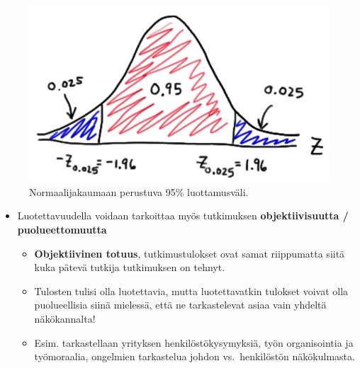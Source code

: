 \documentclass[
]{book}
\providecommand{\tightlist}{%
  \setlength{\itemsep}{0pt}\setlength{\parskip}{0pt}}
\begin{document}
\begin{figure}

{\centering \includegraphics[width=0.75\linewidth]{images/luottamus} 

}

\caption{Normaalijakaumaan perustuva 95\% luottamusväli.}\label{fig:luottamus}
\end{figure}

\begin{itemize}
\tightlist
\item
  Luotettavuudella voidaan tarkoittaa myös tutkimuksen \textbf{objektiivisuutta / puolueettomuutta}

  \begin{itemize}
  \tightlist
  \item
    \textbf{Objektiivinen totuus}, tutkimustulokset ovat samat riippumatta siitä kuka pätevä tutkija tutkimuksen on tehnyt.
  \item
    Tulosten tulisi olla luotettavia, mutta luotettavatkin tulokset voivat olla puolueellisia siinä mielessä, että ne tarkastelevat asiaa vain yhdeltä näkökannalta!
  \item
    Esim. tarkastellaan yrityksen henkilöstökysymyksiä, työn organisointia ja työmoraalia, ongelmien tarkastelua johdon vs.~henkilöstön näkökulmasta.
  \end{itemize}
\end{itemize}
\end{document}
